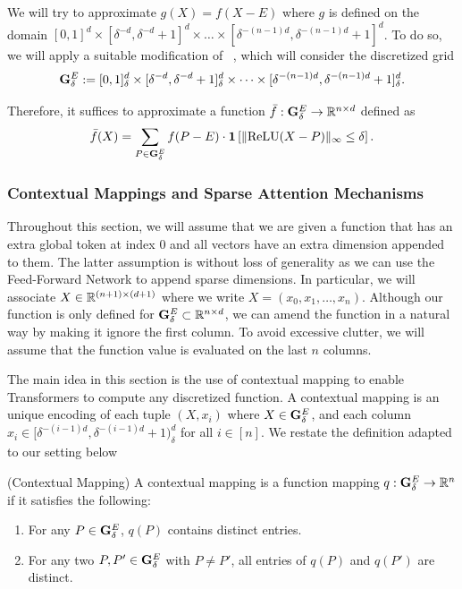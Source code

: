     We will try to approximate $g(X) = f(X - E)$ where $g$ is defined on the domain 
    $[0,1]^d \times [\delta^{-d}, \delta^{-d}+1]^d \times \dots \times [\delta^{-(n-1)d}, \delta^{-(n-1)d}+1]^d  $. To do so, we will apply a suitable modification of ~,
    which will consider the discretized grid 
    \[ \mathbf{G}^{E}_{\delta} := [0,1]_{\delta}^d \times [\delta^{-d}, \delta^{-d}+1]_{\delta}^d \times \dots \times [\delta^{-(n-1)d}, \delta^{-(n-1)d}+1]_{\delta}^d. \] 
    
    Therefore, it suffices to approximate a function $\bar{f}: \mathbf{G}^{E}_{\delta} \to \mathbb{R}^{n \times d}$ 
   defined as  
    \[ \bar{f}(X) = \sum_{P \in \mathbf{G}^{E}_{\delta}} f(P-E) \cdot \mathbf{1} \left[ \lVert\operatorname{ReLU}(X-P)\rVert_{\infty} \leq  \delta  \right].  \] 

\subsubsection{Contextual Mappings and Sparse Attention Mechanisms}

Throughout this section, we will assume that we are given a function that has an extra global token 
at index $0$ and all vectors have an extra dimension appended to them. The latter assumption is  
without loss of generality as we can use the Feed-Forward Network to append sparse dimensions. 
In particular, we will associate $X \in \mathbb{R}^{(n+1) \times (d+1)}$ where we write $X = (x_0,x_1,\dots,x_n)$. 
Although our function is only defined for $\mathbf{G}^{E}_{\delta} \subset \mathbb{R}^{n \times d}$, 
we can amend the function in a natural way by making it ignore the first column. 
To avoid excessive clutter, we will assume that the function value is evaluated on the last $n$ columns. 


The main idea in this section is the use of contextual mapping to enable Transformers 
to compute any discretized function. A contextual mapping is an unique encoding of each 
tuple  $(X,x_i) $ where  $X \in \mathbf{G}^{E}_{\delta}$, and  each column $x_i \in [\delta^{-(i-1)d}, \delta^{-(i-1)d}+1)^d_{\delta}$ for all $i \in [n]$. 
We restate the definition adapted to our setting below
\begin{definition} (Contextual Mapping)
\label{defn:contextual-mapping}
A contextual mapping is a function mapping $q: \mathbf{G}^{E}_{\delta} \to \mathbb{R}^{n}$  if it satisfies the following:
    \begin{enumerate}
        \item For any $P \in \mathbf{G}^{E}_{\delta}$,  $q(P)$  contains distinct entries.
        \item For any two $P, P' \in \mathbf{G}^{E}_{\delta}$ with $P \neq P'$, all entries of $q(P)$ and $q(P')$ 
            are distinct. 
    \end{enumerate}
\end{definition}

